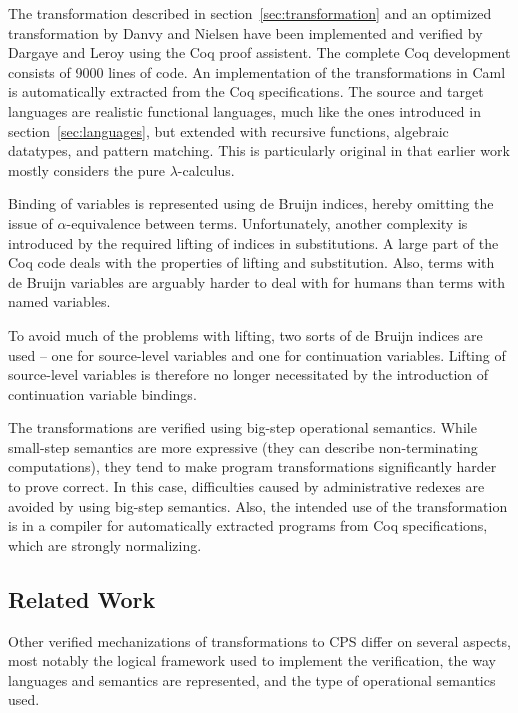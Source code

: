 \documentclass[a4paper,11pt,draft]{article}
\begin{document}
The transformation described in section~\ref{sec:transformation} and an
optimized transformation by Danvy and Nielsen \cite{Danvy-Nielsen-03} have
been implemented and verified by Dargaye and Leroy \cite{Dargaye-Leroy-07}
using the Coq proof assistent.
The complete Coq development consists of 9000 lines of code.
An implementation of the transformations in Caml is automatically extracted
from the Coq specifications.
The source and target languages are realistic functional languages,
much like the ones introduced in section~\ref{sec:languages}, but extended
with recursive functions, algebraic datatypes, and pattern matching.
This is particularly original in that earlier work mostly considers the pure
$\lambda$-calculus.

Binding of variables is represented using de Bruijn indices, hereby omitting
the issue of $\alpha$-equivalence between terms.
Unfortunately, another complexity is introduced by the required lifting of
indices in substitutions.
A large part of the Coq code deals with the properties of lifting and
substitution.
Also, terms with de Bruijn variables are arguably harder to deal with for
humans than terms with named variables.

To avoid much of the problems with lifting, two sorts of de Bruijn indices are
used -- one for source-level variables and one for continuation variables.
Lifting of source-level variables is therefore no longer necessitated by the
introduction of continuation variable bindings.

The transformations are verified using big-step operational semantics.
While small-step semantics are more expressive (they can describe
non-terminating computations), they tend to make program transformations
significantly harder to prove correct.
In this case, difficulties caused by administrative redexes are avoided by
using big-step semantics.
Also, the intended use of the transformation is in a compiler for
automatically extracted programs from Coq specifications, which are strongly
normalizing.

\subsection{Related Work}

Other verified mechanizations of transformations to CPS differ on several
aspects, most notably the logical framework used to implement the
verification, the way languages and semantics are represented, and the type
of operational semantics used.
\end{document}
